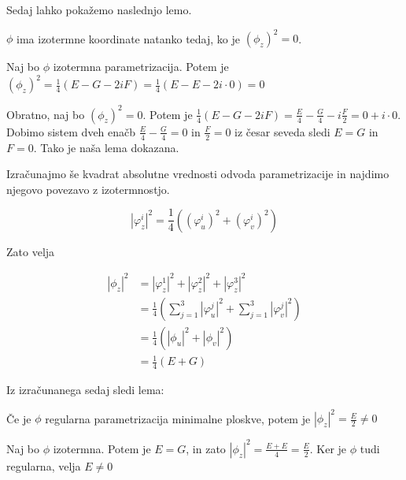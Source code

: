 \documentclass[mat1]{fmfdelo}
\begin{document}
Sedaj lahko pokažemo naslednjo lemo.

\begin{lema}
    $\phi$ ima izotermne koordinate natanko tedaj, ko je $\left( \phi_z \right)^2 = 0$.
\end{lema}

\begin{dokaz}
    Naj bo $\phi$ izotermna parametrizacija. Potem je $\left( \phi_z \right)^2 = \frac{1}{4} \left( E - G - 2i F \right) 
    = \frac{1}{4} \left( E - E - 2i \cdot 0 \right) = 0$

    Obratno, naj bo $\left( \phi_z \right)^2 = 0$. Potem je $\frac{1}{4} \left( E - G - 2i F \right) = \frac{E}{4} - \frac{G}{4} - i \frac{F}{2} = 0 + i \cdot 0$.
    Dobimo sistem dveh enačb $\frac{E}{4} - \frac{G}{4} = 0$ in $\frac{F}{2} = 0$ iz česar seveda sledi $E = G$ in $F = 0$. Tako je naša lema dokazana.
\end{dokaz}

Izračunajmo še kvadrat absolutne vrednosti odvoda parametrizacije in najdimo njegovo povezavo z izotermnostjo.


$$ \left\lvert \varphi^{i}_z \right\rvert^2 = \frac{1}{4} \left( \left( \varphi^{i}_u \right)^2 + \left( \varphi^{i}_v \right)^2 \right) $$

Zato velja

\begin{align*}
    \left\lvert \phi_z \right\rvert^2 &= \left\lvert \varphi^{1}_z \right\rvert^2 + \left\lvert \varphi^{2}_z \right\rvert^2 + \left\lvert \varphi^{3}_z \right\rvert^2 \\
    &= \frac{1}{4} \left( \sum_{j = 1}^{3} \left\lvert \varphi^{j}_u \right\rvert^2 + \sum_{j = 1}^{3} \left\lvert \varphi^{j}_v \right\rvert^2 \right) \\
    &= \frac{1}{4} \left( \left\lvert \phi_u \right\rvert^2 + \left\lvert \phi_v \right\rvert^2 \right) \\
    &= \frac{1}{4} \left( E + G \right)
\end{align*}

Iz izračunanega sedaj sledi lema:

\begin{lema}
    Če je $\phi$ regularna parametrizacija minimalne ploskve, potem je $\left\lvert \phi_z \right\rvert^2 = \frac{E}{2} \neq 0$
\end{lema}

\begin{dokaz}
    Naj bo $\phi$ izotermna. Potem je $E = G$, in zato $\left\lvert \phi_z \right\rvert^2 = \frac{E + E}{4} = \frac{E}{2}$. 
    Ker je $\phi$ tudi regularna, velja $E \neq 0$
\end{dokaz}
\end{document}
